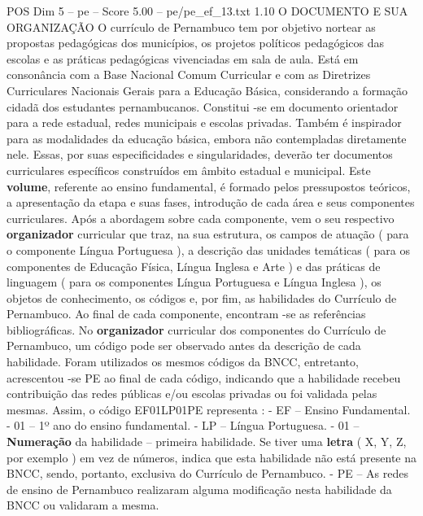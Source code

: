 \begin{textsample}{POS Dim 5 – pe – Score 5.00 – pe/pe\_ef\_13.txt}  \label{ex:f5_pos_204}
1.10 O DOCUMENTO E SUA ORGANIZAÇÃO O currículo de Pernambuco tem por objetivo nortear as propostas pedagógicas dos municípios, os projetos políticos pedagógicos das escolas e as práticas pedagógicas vivenciadas em sala de aula.
Está em consonância com a Base Nacional Comum Curricular e com as Diretrizes Curriculares Nacionais Gerais para a Educação Básica, considerando a formação cidadã dos estudantes pernambucanos.
Constitui -se em documento orientador para a rede estadual, redes municipais e escolas privadas.
Também é inspirador para as modalidades da educação básica, embora não contempladas diretamente nele.
Essas, por suas especificidades e singularidades, deverão ter documentos curriculares específicos construídos em âmbito estadual e municipal.
Este \textbf{volume}, referente ao ensino fundamental, é formado pelos pressupostos teóricos, a apresentação da etapa e suas fases, introdução de cada área e seus componentes curriculares.
Após a abordagem sobre cada componente, vem o seu respectivo \textbf{organizador} curricular que traz, na sua estrutura, os campos de atuação ( para o componente Língua Portuguesa ), a descrição das unidades temáticas ( para os componentes de Educação Física, Língua Inglesa e Arte ) e das práticas de linguagem ( para os componentes Língua Portuguesa e Língua Inglesa ), os objetos de conhecimento, os códigos e, por fim, as habilidades do Currículo de Pernambuco.
Ao final de cada componente, encontram -se as referências bibliográficas.
No \textbf{organizador} curricular dos componentes do Currículo de Pernambuco, um código pode ser observado antes da descrição de cada habilidade.
Foram utilizados os mesmos códigos da BNCC, entretanto, acrescentou -se PE ao final de cada código, indicando que a habilidade recebeu contribuição das redes públicas e/ou escolas privadas ou foi validada pelas mesmas.
Assim, o código EF01LP01PE representa : - EF – Ensino Fundamental. - 01 – 1º ano do ensino fundamental. - LP – Língua Portuguesa. - 01 – \textbf{Numeração} da habilidade – primeira habilidade.
Se tiver uma \textbf{letra} ( X, Y, Z, por exemplo ) em vez de números, indica que esta habilidade não está presente na BNCC, sendo, portanto, exclusiva do Currículo de Pernambuco. - PE – As redes de ensino de Pernambuco realizaram alguma modificação nesta habilidade da BNCC ou validaram a mesma.

\end{textsample}
